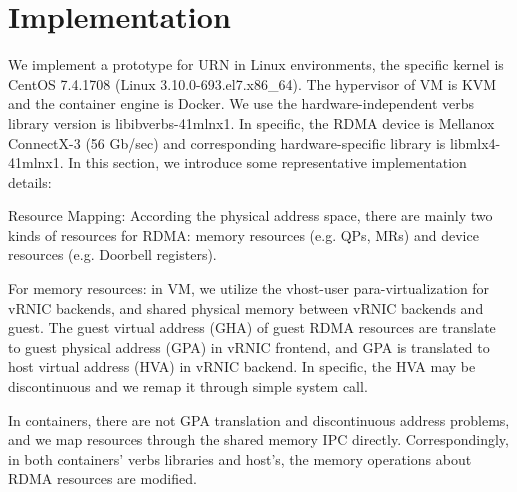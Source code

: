 \section{Implementation}
 We implement a prototype for URN in Linux environments, the specific kernel is CentOS 7.4.1708 (Linux 3.10.0-693.el7.x86\_64). The hypervisor of VM is KVM and the container engine is Docker. We use the hardware-independent verbs library version is libibverbs-41mlnx1. In specific, the RDMA device is Mellanox ConnectX-3 (56 Gb/sec) and corresponding hardware-specific library is libmlx4-41mlnx1. In this section, we introduce some representative implementation details:
 
 Resource Mapping: According the physical address space, there are mainly two kinds of resources for RDMA: memory resources (e.g. QPs, MRs) and device resources (e.g. Doorbell registers). 
 
 For memory resources: in VM, we utilize the vhost-user para-virtualization for vRNIC backends, and shared physical memory between vRNIC backends and guest. The guest virtual address (GHA) of guest RDMA resources are translate to guest physical address (GPA) in vRNIC frontend, and GPA is translated to host virtual address (HVA) in vRNIC backend. In specific, the HVA may be discontinuous and we remap it through simple system call.
 
 In containers, there are not GPA translation and discontinuous address problems, and we map resources through the shared memory IPC directly. Correspondingly, in both containers' verbs libraries and host's, the memory operations about RDMA resources are modified.
 
